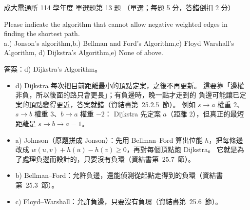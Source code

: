 \begin{pastexam}[label={px:ncku-114-cce-ds-13}]{成大電通所 114 學年度 單選題第 13 題}
（單選；每題 5 分，答錯倒扣 2 分）

Please indicate the algorithm that cannot allow negative weighted edges in finding the shortest path.\\
a.) Jonson's algorithm,\quad b.) Bellman and Ford's Algorithm,\quad c) Floyd Warshall's Algorithm,\quad
d) Dijkstra's Algorithm,\quad e) None of above.
\end{pastexam}

\begin{pastsoln}
答案：d) Dijkstra's Algorithm。

\begin{itemize}
\item d) Dijkstra 每次把目前距離最小的頂點定案，之後不再更新。 這要靠「邊權非負，所以後面的路只會更長」；有負邊時，晚一點才走到的
負邊可能讓已定案的頂點變得更近，答案就錯（資結書第~25.2.5~節）。 例如 $s \to a$ 權重 2、$s \to b$ 權重 3、$b \to a$ 權重 $-2$：
Dijkstra 先定案 $a$（距離 2），但真正的最短距離是 $s \to b \to a = 1$。
\item a) Johnson（原題拼成 Jonson）：先用 Bellman--Ford 算出位能 $h$，把每條邊改成 $w(u,v) + h(u) - h(v) \ge 0$，再對每個頂點跑
Dijkstra。 它就是為了處理負邊而設計的，只要沒有負環（資結書第~25.7~節）。
\item b) Bellman--Ford：允許負邊，還能偵測從起點走得到的負環（資結書第~25.3~節）。
\item c) Floyd--Warshall：允許負邊，只要沒有負環（資結書第~25.6~節）。
\end{itemize}
\end{pastsoln}
